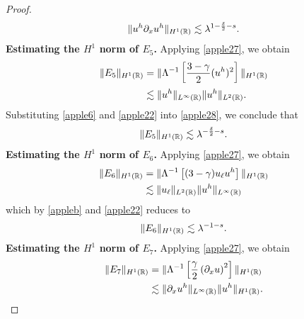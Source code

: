 \begin{proof}
\begin{equation}
\begin{split}
		\|u^h \partial_x u^h \|_{H^1(\mathbb{R})} \lesssim \lambda^{1-\frac{\delta}{2}-s}.
		\label{apple26}
	\end{split}
\end{equation}
%
%
%
{\bf Estimating the $H^1$ norm of $\hyperref[all_errors_together]{E_5}$.}
Applying \eqref{apple27}, we obtain
\begin{equation}
	\begin{split}
		\|E_5\|_{H^1(\mathbb{R})}
		& = \|\Lambda^{-1}\left[ \frac{3-\gamma}{2}(u^h)^2
		\right]\|_{H^1(\mathbb{R})}
		\\
		& \lesssim \|u^h\|_{L^\infty(\mathbb{R})} \|u^h\|_{L^2(\mathbb{R})}.
		\label{apple28}
	\end{split}
\end{equation}
Substituting \eqref{apple6} and \eqref{apple22} into \eqref{apple28}, we conclude that
\begin{equation}
	\begin{split}
		\|E_5\|_{H^1(\mathbb{R})} \lesssim \lambda^{-\frac{\delta}{2}-s}.
		\label{apple29}
	\end{split}
\end{equation}
%
%
%
%
%
{\bf Estimating the $H^1$ norm of $\hyperref[all_errors_together]{E_6}$.} Applying \eqref{apple27}, we obtain
\begin{equation}
	\begin{split}
		\|E_6\|_{H^1(\mathbb{R})} 
		& = \|\Lambda^{-1} \left[ (3 -\gamma) u_\ell u^h \right]\|_{H^1(\mathbb{R})}
		\\
		& \lesssim \|u_\ell\|_{L^2(\mathbb{R})} \|u^h\|_{L^\infty(\mathbb{R})}
		\label{apple30}
	\end{split}
\end{equation}
which by  \cref{appleb} and \eqref{apple22} reduces to
\begin{equation}
	\begin{split}
		\|E_6\|_{H^1(\mathbb{R})} \lesssim \lambda^{-1-s}.
		\label{apple31}
	\end{split}
\end{equation}
%
%
%
%
%
{\bf Estimating the $H^1$ norm of $\hyperref[all_errors_together]{E_7}$.} Applying \eqref{apple27}, we obtain
\begin{equation}
	\begin{split}
		\|E_7\|_{H^1(\mathbb{R})} 
		& = \|\Lambda^{-1} \left[ \frac{\gamma}{2}\left( \partial_x u \right)^2
		\right]\|_{H^1(\mathbb{R})}
		\\
		& \lesssim  \|\partial_x u^h\|_{L^\infty(\mathbb{R})} \|u^h\|_{H^1(\mathbb{R})}.
		\label{apple32}
	\end{split}
\end{equation}

\end{proof}
